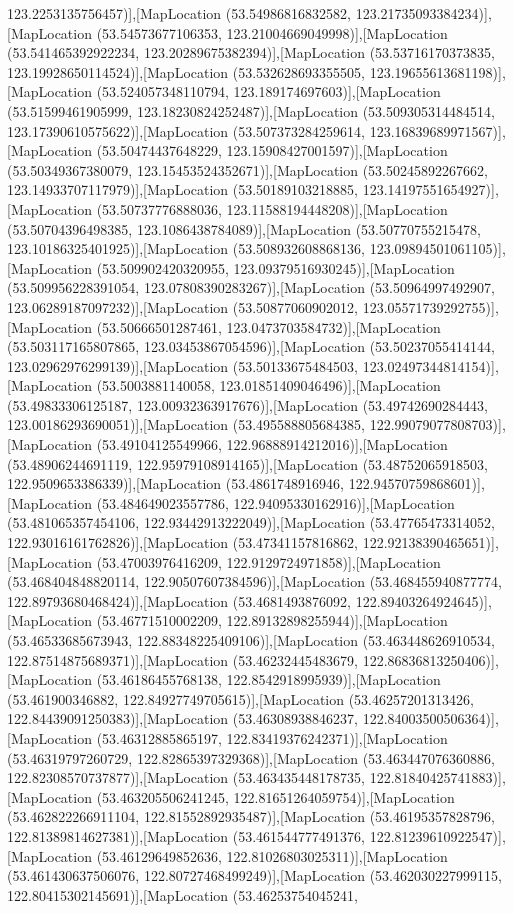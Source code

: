 123.2253135756457)],[MapLocation (53.54986816832582, 123.21735093384234)],[MapLocation (53.54573677106353, 123.21004669049998)],[MapLocation (53.541465392922234, 123.20289675382394)],[MapLocation (53.53716170373835, 123.19928650114524)],[MapLocation (53.532628693355505, 123.19655613681198)],[MapLocation (53.524057348110794, 123.189174697603)],[MapLocation (53.51599461905999, 123.18230824252487)],[MapLocation (53.509305314484514, 123.17390610575622)],[MapLocation (53.507373284259614, 123.16839689971567)],[MapLocation (53.50474437648229, 123.15908427001597)],[MapLocation (53.50349367380079, 123.15453524352671)],[MapLocation (53.50245892267662, 123.14933707117979)],[MapLocation (53.50189103218885, 123.14197551654927)],[MapLocation (53.50737776888036, 123.11588194448208)],[MapLocation (53.50704396498385, 123.1086438784089)],[MapLocation (53.50770755215478, 123.10186325401925)],[MapLocation (53.508932608868136, 123.09894501061105)],[MapLocation (53.509902420320955, 123.09379516930245)],[MapLocation (53.509956228391054, 123.07808390283267)],[MapLocation (53.50964997492907, 123.06289187097232)],[MapLocation (53.50877060902012, 123.05571739292755)],[MapLocation (53.50666501287461, 123.0473703584732)],[MapLocation (53.503117165807865, 123.03453867054596)],[MapLocation (53.50237055414144, 123.02962976299139)],[MapLocation (53.50133675484503, 123.02497344814154)],[MapLocation (53.5003881140058, 123.01851409046496)],[MapLocation (53.49833306125187, 123.00932363917676)],[MapLocation (53.49742690284443, 123.00186293690051)],[MapLocation (53.495588805684385, 122.99079077808703)],[MapLocation (53.49104125549966, 122.96888914212016)],[MapLocation (53.48906244691119, 122.95979108914165)],[MapLocation (53.48752065918503, 122.9509653386339)],[MapLocation (53.4861748916946, 122.94570759868601)],[MapLocation (53.484649023557786, 122.94095330162916)],[MapLocation (53.481065357454106, 122.93442913222049)],[MapLocation (53.47765473314052, 122.93016161762826)],[MapLocation (53.47341157816862, 122.92138390465651)],[MapLocation (53.47003976416209, 122.9129724971858)],[MapLocation (53.468404848820114, 122.90507607384596)],[MapLocation (53.468455940877774, 122.89793680468424)],[MapLocation (53.4681493876092, 122.89403264924645)],[MapLocation (53.46771510002209, 122.89132898255944)],[MapLocation (53.46533685673943, 122.88348225409106)],[MapLocation (53.463448626910534, 122.87514875689371)],[MapLocation (53.46232445483679, 122.86836813250406)],[MapLocation (53.46186455768138, 122.8542918995939)],[MapLocation (53.461900346882, 122.84927749705615)],[MapLocation (53.46257201313426, 122.84439091250383)],[MapLocation (53.46308938846237, 122.84003500506364)],[MapLocation (53.46312885865197, 122.83419376242371)],[MapLocation (53.46319797260729, 122.82865397329368)],[MapLocation (53.463447076360886, 122.82308570737877)],[MapLocation (53.463435448178735, 122.81840425741883)],[MapLocation (53.463205506241245, 122.81651264059754)],[MapLocation (53.462822266911104, 122.81552892935487)],[MapLocation (53.46195357828796, 122.81389814627381)],[MapLocation (53.461544777491376, 122.81239610922547)],[MapLocation (53.46129649852636, 122.81026803025311)],[MapLocation (53.461430637506076, 122.80727468499249)],[MapLocation (53.462030227999115, 122.80415302145691)],[MapLocation (53.46253754045241, 